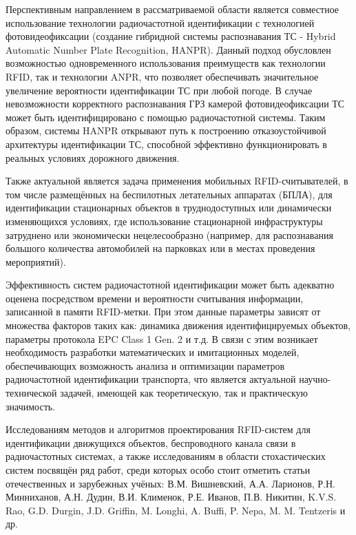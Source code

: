 \documentclass[12pt]{article}
\theoremstyle{definition}
\begin{document}
Перспективным направлением в рассматриваемой области является совместное использование технологии радиочастотной идентификации с технологией фотовидеофиксации (создание гибридной системы распознавания ТС - Hybrid Automatic Number Plate Recognition, HANPR). Данный подход обусловлен возможностью одновременного использования преимуществ как технологии RFID, так и технологии ANPR, что позволяет обеспечивать значительное увеличение вероятности идентификации ТС при любой погоде. В случае невозможности корректного распознавания ГРЗ камерой фотовидеофиксации ТС может быть идентифицировано с помощью радиочастотной системы. Таким образом, системы HANPR открывают путь к построению отказоустойчивой архитектуры идентификации ТС, способной эффективно функционировать в реальных условиях дорожного движения.

Также актуальной является задача применения мобильных RFID-считывателей, в том числе размещённых на беспилотных летательных аппаратах (БПЛА), для идентификации стационарных объектов в труднодоступных или динамически изменяющихся условиях, где использование стационарной инфраструктуры затруднено или экономически нецелесообразно (например, для распознавания большого количества автомобилей на парковках или в местах проведения мероприятий).

Эффективность систем радиочастотной идентификации может быть адекватно оценена посредством времени и вероятности считывания информации, записанной в памяти RFID-метки. При этом данные параметры зависят от множества факторов таких как: динамика движения идентифицируемых объектов, параметры протокола EPC Class 1 Gen. 2 и т.д. В связи с этим возникает необходимость разработки математических и имитационных моделей, обеспечивающих возможность анализа и оптимизации параметров радиочастотной идентификации транспорта, что является актуальной научно-технической задачей, имеющей как теоретическую, так и практическую значимость.

Исследованиям методов и алгоритмов проектирования RFID-систем для идентификации движущихся объектов, беспроводного канала связи в радиочастотных системах, а также исследованиям в области стохастических систем посвящён ряд работ, среди которых особо стоит отметить статьи отечественных и зарубежных учёных: В.М. Вишневский, А.А. Ларионов, Р.Н. Минниханов, А.Н. Дудин, В.И. Клименок, Р.Е. Иванов, П.В. Никитин, K.V.S. Rao, G.D. Durgin, J.D. Griffin, M. Longhi, A. Buffi, P. Nepa, M. M. Tentzeris и др.

\end{document}
